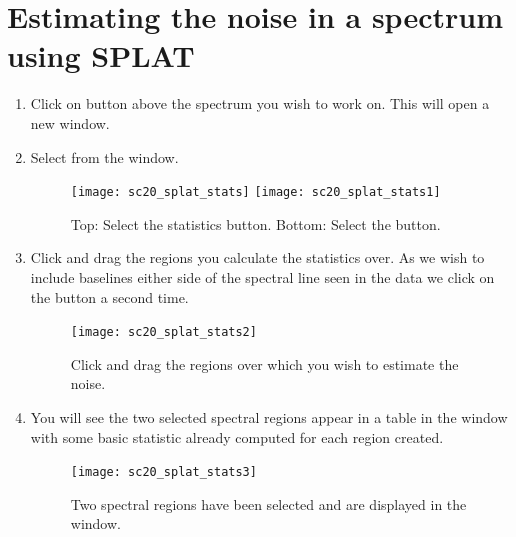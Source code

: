 \documentclass[11pt,oneside,chapters]{starlink}
\begin{document}
\section{Estimating the noise in a spectrum using SPLAT}
\label{sec:splat-stats}

\begin{enumerate}[label=(\textbf{\arabic*})]

\item Click on 
button above the spectrum you wish to work on. This will open a
new window.


\item Select  from the  window.

\begin{figure}[h!]
\begin{center}
\texttt{[image: sc20\_splat\_stats]}
\texttt{[image: sc20\_splat\_stats1]}
\caption[Select the statistics button.]{\label{fig:splat_stats1}
  Top: Select the statistics button. Bottom: Select the 
  button.}
\end{center}
\end{figure}

\item Click and drag the regions you calculate the statistics over.
As we wish to include baselines either side of the spectral line seen
in the data we click on the  button a second time.

\begin{figure}[h!]
\begin{center}
\texttt{[image: sc20\_splat\_stats2]}
\caption[Select region for statistics.]{\label{fig:splat_stats2}
  Click and drag the regions over which you wish to estimate the noise.}
\end{center}
\end{figure}

\item You will see the two selected spectral regions appear in
a table in the  window with some
basic statistic already computed for each region created.

\begin{figure}[h!]
\begin{center}
\texttt{[image: sc20\_splat\_stats3]}
\caption[Two spectral regions have been selected.]{\label{fig:splat_stats3}
  Two spectral regions have been selected and are displayed
  in the  window.}
\end{center}
\end{figure}


\end{enumerate}
\end{document}
